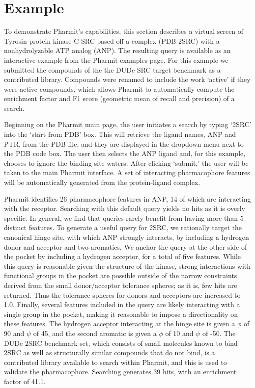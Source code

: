 \section{Example}

To demonstrate Pharmit's capabilities, this section describes a virtual screen of Tyrosin-protein kinase C-SRC based off a complex (PDB 2SRC) with a nonhydrolyzable ATP analog (ANP). The resulting query is available as an interactive example from the Pharmit examples page.  For this example we submitted the compounds of the the DUDe \cite{Mysinger_2012} SRC target benchmark as a contributed library.  Compounds were renamed to include the work `active' if they were active compounds, which allows Pharmit to automatically compute the enrichment factor and F1 score (geometric mean of recall and precision) of a search.

  Beginning on the Pharmit main page, the user initiates a search by typing `2SRC' into the `start from PDB' box. This will retrieve the ligand names, ANP and PTR, from the PDB file, and they are displayed in the dropdown menu next to the PDB code box. The user then selects the ANP ligand and, for this example, chooses to ignore the binding site waters. After clicking `submit,' the user will be taken to the main Pharmit interface. A set of interacting pharmacophore features will be automatically generated from the protein-ligand complex.
  
  Pharmit identifies 26 pharmacophore features in ANP, 14 of which are interacting with the receptor.  Searching with this default query yields no hits as it is overly specific.  In general, we find that queries rarely benefit from having more than 5 distinct features.
  To generate a useful query for 2SRC, we rationally target the canonical hinge site, with which ANP strongly interacts, by including a hydrogen donor and acceptor and two aromatics. 
  We anchor the query at the other side of the pocket by including a hydrogen acceptor, for a total of five features. While this query is reasonable given the structure of the kinase, strong interactions with functional groups in the pocket are possible outside of the narrow constraints derived from the small donor/acceptor tolerance spheres; as it is, few hits are returned. Thus the tolerance spheres for donors and acceptors are increased to 1.0. Finally, several features included in the query are likely interacting with a single group in the pocket, making it reasonable to impose a directionality on these features. The hydrogen acceptor interacting at the hinge site is given a $\phi$ of 90 and $\psi$ of 45, and the second aromatic is given a $\phi$ of 10 and $\psi$ of -50. The DUDe 2SRC benchmark set, which consists of small molecules known to bind 2SRC as well as structurally similar compounds that do not bind, is a contributed library available to search within Pharmit, and this is used to validate the pharmacophore. Searching generates 39 hits, with an enrichment factor of 41.1. 
